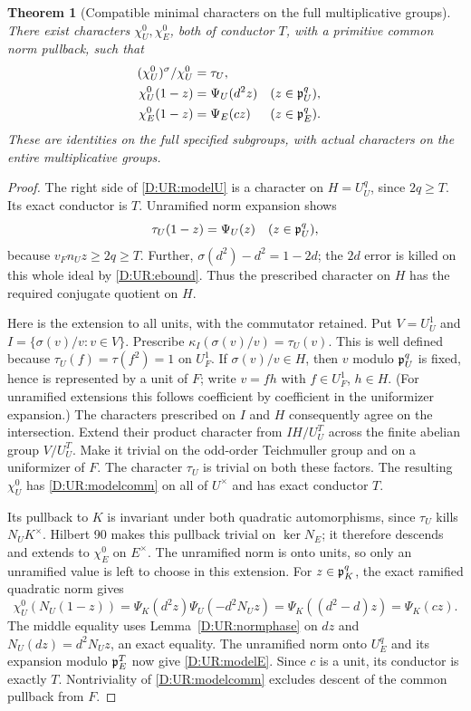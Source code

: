 \documentclass[11pt]{amsart}
\newtheorem{theorem}{Theorem}[section]
\theoremstyle{definition}
\theoremstyle{remark}
\begin{document}
\begin{theorem}[Compatible minimal characters on the full multiplicative groups]\label{D:UR:models}
There exist characters $\chi_U^0,\chi_E^0$, both of conductor $T$, with
a primitive common norm pullback, such that
\begin{align}
 (\chi_U^0)^\sigma/\chi_U^0&=\tau_U,\label{D:UR:modelcomm}\\
 \chi_U^0(1-z)&=\Psi_U(d^2z) &&(z\in\mathfrak p_U^q),\label{D:UR:modelU}\\
 \chi_E^0(1-z)&=\Psi_E(cz) &&(z\in\mathfrak p_E^q).\label{D:UR:modelE}
\end{align}
These are identities on the full specified subgroups, with actual
characters on the entire multiplicative groups.
\end{theorem}
\begin{proof}
The right side of \eqref{D:UR:modelU} is a character on $H=U_U^q$, since
$2q\ge T$. Its exact conductor is $T$. Unramified norm expansion shows
\[
 \tau_U(1-z)=\Psi_U(z)\quad(z\in\mathfrak p_U^q),
\]
because $v_F n_Uz\ge2q\ge T$. Further,
$\sigma(d^2)-d^2=1-2d$; the $2d$ error is killed on this whole ideal by
\eqref{D:UR:ebound}. Thus the prescribed character on $H$ has the required
conjugate quotient on $H$.

Here is the extension to all units, with the commutator retained.
Put $V=U_U^1$ and $I=\{\sigma(v)/v:v\in V\}$. Prescribe
$\kappa_I(\sigma(v)/v)=\tau_U(v)$. This is well defined because
$\tau_U(f)=\tau(f^2)=1$ on $U_F^1$. If $\sigma(v)/v\in H$, then $v$
modulo $\mathfrak p_U^q$ is fixed, hence is represented by a unit of $F$; write
$v=fh$ with $f\in U_F^1$, $h\in H$. (For unramified extensions this
follows coefficient by coefficient in the uniformizer expansion.)
The characters prescribed on $I$ and $H$ consequently agree on the
intersection. Extend their product character from $IH/U_U^T$ across the
finite abelian group $V/U_U^T$. Make it trivial on the odd-order
Teichmuller group and on a uniformizer of $F$. The character $\tau_U$ is
trivial on both these factors. The resulting $\chi_U^0$ has
\eqref{D:UR:modelcomm} on all of $U^\times$ and has exact conductor $T$.

Its pullback to $K$ is invariant under both quadratic automorphisms,
since $\tau_U$ kills $N_UK^\times$. Hilbert 90 makes this pullback trivial
on $\ker N_E$; it therefore descends and extends to $\chi_E^0$ on
$E^\times$. The unramified norm is onto units, so only an unramified value
is left to choose in this extension.
For $z\in\mathfrak p_K^q$, the exact ramified quadratic norm gives
\[
 \chi_U^0(N_U(1-z))
 =\Psi_K(d^2z)\Psi_U(-d^2N_Uz)
 =\Psi_K((d^2-d)z)=\Psi_K(cz).
\]
The middle equality uses Lemma~\ref{D:UR:normphase} on $dz$ and
$N_U(dz)=d^2N_Uz$, an exact equality. The unramified norm onto $U_E^q$
and its expansion modulo $\mathfrak p_E^T$ now give \eqref{D:UR:modelE}. Since $c$ is
a unit, its conductor is exactly $T$. Nontriviality of \eqref{D:UR:modelcomm}
excludes descent of the common pullback from $F$.
\end{proof}
\end{document}
